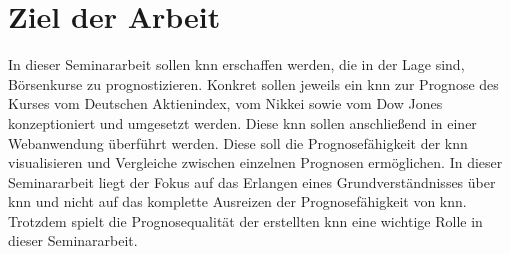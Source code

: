 \section{Ziel der Arbeit}
\label{section:Ziel der Arbeit}
In dieser Seminararbeit sollen \acs{knn} erschaffen werden, die in der Lage sind, Börsenkurse zu prognostizieren. Konkret sollen jeweils ein \acs{knn} zur Prognose des Kurses vom Deutschen Aktienindex, vom Nikkei sowie vom Dow Jones konzeptioniert und umgesetzt werden. Diese \acs{knn} sollen anschließend in einer Webanwendung überführt werden. Diese soll die Prognosefähigkeit der \acs{knn} visualisieren und Vergleiche zwischen einzelnen Prognosen ermöglichen. In dieser Seminararbeit liegt der Fokus auf das Erlangen eines Grundverständnisses über \acs{knn} und nicht auf das komplette Ausreizen der Prognosefähigkeit von \acs{knn}. Trotzdem spielt die Prognosequalität der erstellten \acs{knn} eine wichtige Rolle in dieser Seminararbeit.





